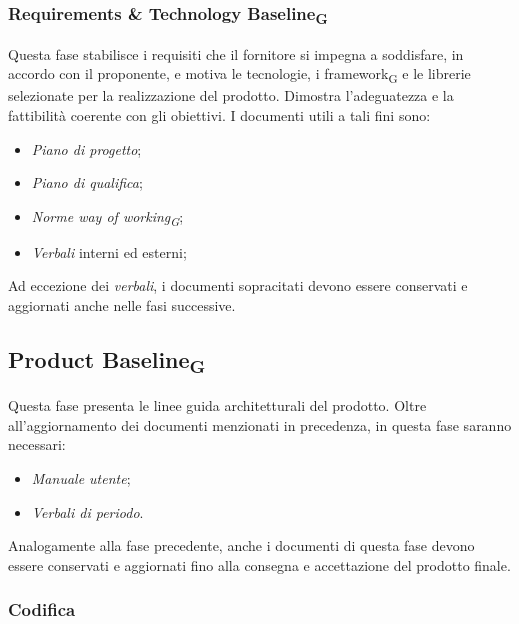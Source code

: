 \documentclass{article}
\begin{document}
\subsubsection*{Requirements \& Technology Baseline\textsubscript{G}}
Questa fase stabilisce i requisiti che il fornitore si impegna a soddisfare, in accordo con il proponente, e motiva le tecnologie, i framework\textsubscript{G} e le librerie selezionate per la realizzazione del prodotto. Dimostra l'adeguatezza e la fattibilità coerente con gli obiettivi. I documenti utili a tali fini sono:
\begin{itemize}
    \item \textit{Piano di progetto};
    \item \textit{Piano di qualifica};
    \item \textit{Norme way of working\textsubscript{G}};
    \item \textit{Verbali} interni ed esterni;
\end{itemize}
Ad eccezione dei \textit{verbali}, i documenti sopracitati devono essere conservati e aggiornati anche nelle fasi successive.
\subsection*{Product Baseline\textsubscript{G}}
Questa fase presenta le linee guida architetturali del prodotto. Oltre all'aggiornamento dei documenti menzionati in precedenza, in questa fase saranno necessari:
\begin{itemize}
    \item \textit{Manuale utente};
    \item \textit{Verbali di periodo}.
\end{itemize}
Analogamente alla fase precedente, anche i documenti di questa fase devono essere conservati e aggiornati fino alla consegna e accettazione del prodotto finale.
\subsubsection{Codifica}
\end{document}
